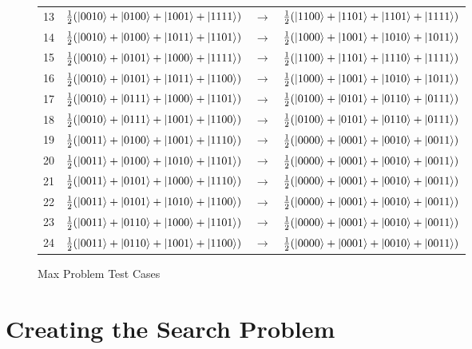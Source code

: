 \begin{figure}
\begin{center}
\begin{tabular}{c|ccc|}
  13 & $\frac{1}{2}(\ket{0010}+\ket{0100}+\ket{1001}+\ket{1111})$ & $\rightarrow$ & $\frac{1}{2}(\ket{1100}+\ket{1101}+\ket{1101}+\ket{1111})$ \\ %
  14 & $\frac{1}{2}(\ket{0010}+\ket{0100}+\ket{1011}+\ket{1101})$ & $\rightarrow$ & $\frac{1}{2}(\ket{1000}+\ket{1001}+\ket{1010}+\ket{1011})$ \\ %
  15 & $\frac{1}{2}(\ket{0010}+\ket{0101}+\ket{1000}+\ket{1111})$ & $\rightarrow$ & $\frac{1}{2}(\ket{1100}+\ket{1101}+\ket{1110}+\ket{1111})$ \\ %
  16 & $\frac{1}{2}(\ket{0010}+\ket{0101}+\ket{1011}+\ket{1100})$ & $\rightarrow$ & $\frac{1}{2}(\ket{1000}+\ket{1001}+\ket{1010}+\ket{1011})$ \\ %
  17 & $\frac{1}{2}(\ket{0010}+\ket{0111}+\ket{1000}+\ket{1101})$ & $\rightarrow$ & $\frac{1}{2}(\ket{0100}+\ket{0101}+\ket{0110}+\ket{0111})$ \\ %
  18 & $\frac{1}{2}(\ket{0010}+\ket{0111}+\ket{1001}+\ket{1100})$ & $\rightarrow$ & $\frac{1}{2}(\ket{0100}+\ket{0101}+\ket{0110}+\ket{0111})$ \\ \hline
  19 & $\frac{1}{2}(\ket{0011}+\ket{0100}+\ket{1001}+\ket{1110})$ & $\rightarrow$ & $\frac{1}{2}(\ket{0000}+\ket{0001}+\ket{0010}+\ket{0011})$ \\ %
  20 & $\frac{1}{2}(\ket{0011}+\ket{0100}+\ket{1010}+\ket{1101})$ & $\rightarrow$ & $\frac{1}{2}(\ket{0000}+\ket{0001}+\ket{0010}+\ket{0011})$ \\ %
  21 & $\frac{1}{2}(\ket{0011}+\ket{0101}+\ket{1000}+\ket{1110})$ & $\rightarrow$ & $\frac{1}{2}(\ket{0000}+\ket{0001}+\ket{0010}+\ket{0011})$ \\ %
  22 & $\frac{1}{2}(\ket{0011}+\ket{0101}+\ket{1010}+\ket{1100})$ & $\rightarrow$ & $\frac{1}{2}(\ket{0000}+\ket{0001}+\ket{0010}+\ket{0011})$ \\ %
  23 & $\frac{1}{2}(\ket{0011}+\ket{0110}+\ket{1000}+\ket{1101})$ & $\rightarrow$ & $\frac{1}{2}(\ket{0000}+\ket{0001}+\ket{0010}+\ket{0011})$ \\ %
  24 & $\frac{1}{2}(\ket{0011}+\ket{0110}+\ket{1001}+\ket{1100})$ & $\rightarrow$ & $\frac{1}{2}(\ket{0000}+\ket{0001}+\ket{0010}+\ket{0011})$ \\ \hline
 \end{tabular}
\end{center}
\caption{Max Problem Test Cases}
\label{fig:maxprobtcs}
\end{figure}

\section{Creating the Search Problem}
\label{sec:createsearchproblem}

